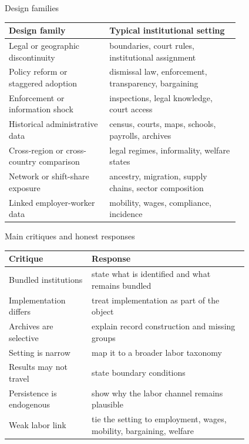 \documentclass[aspectratio=169,11pt]{beamer}
\begin{document}
\begin{frame}{Design families}
\small
\begin{tabular}{p{0.34\linewidth} p{0.44\linewidth}}
\toprule
Design family & Typical institutional setting \\
\midrule
Legal or geographic discontinuity & boundaries, court rules, institutional assignment \\
Policy reform or staggered adoption & dismissal law, enforcement, transparency, bargaining \\
Enforcement or information shock & inspections, legal knowledge, court access \\
Historical administrative data & census, courts, maps, schools, payrolls, archives \\
Cross-region or cross-country comparison & legal regimes, informality, welfare states \\
Network or shift-share exposure & ancestry, migration, supply chains, sector composition \\
Linked employer-worker data & mobility, wages, compliance, incidence \\
\bottomrule
\end{tabular}
\end{frame}

\begin{frame}{Main critiques and honest responses}
\small
\begin{tabular}{p{0.28\linewidth} p{0.53\linewidth}}
\toprule
Critique & Response \\
\midrule
Bundled institutions & state what is identified and what remains bundled \\
Implementation differs & treat implementation as part of the object \\
Archives are selective & explain record construction and missing groups \\
Setting is narrow & map it to a broader labor taxonomy \\
Results may not travel & state boundary conditions \\
Persistence is endogenous & show why the labor channel remains plausible \\
Weak labor link & tie the setting to employment, wages, mobility, bargaining, welfare \\
\bottomrule
\end{tabular}
\end{frame}
\end{document}
